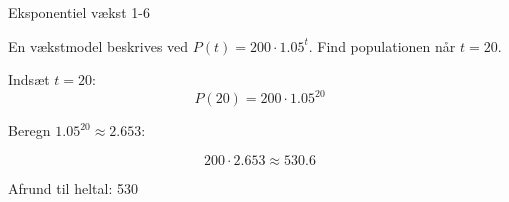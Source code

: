 \documentclass{article}
\begin{document}
\newpage

\begin{exercise}{Eksponentiel vækst 1-6}

En vækstmodel beskrives ved $P(t) = 200 \cdot 1.05^t$. Find populationen når $t = 20$.


\hint

Indsæt $t = 20$:
\[
P(20) = 200 \cdot 1.05^{20}
\]

\hint

Beregn $1.05^{20} \approx 2.653$:

\hint
\[
200 \cdot 2.653 \approx 530.6
\]

\hint

Afrund til heltal: 530

\end{exercise}
\end{document}
